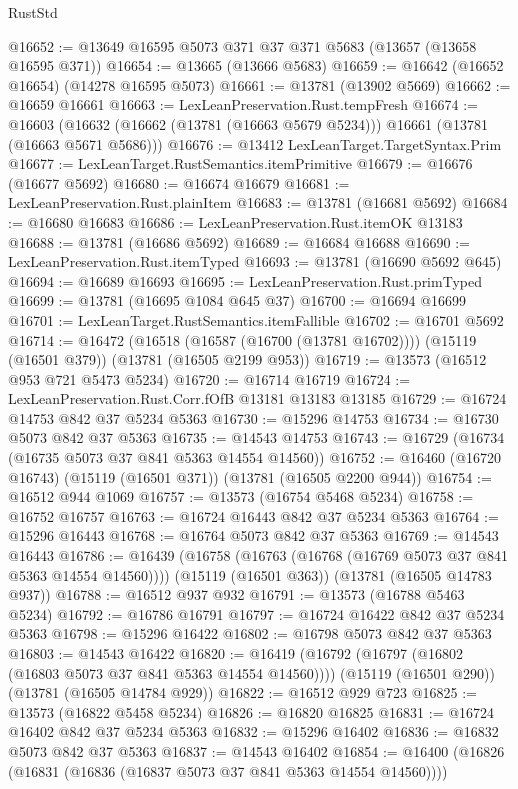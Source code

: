 \begin{lexlean}{RustStd}
\begin{coremodule}
@16652 := @13649 @16595 @5073 @371 @37 @371 @5683 (@13657 (@13658 @16595 @371))
@16654 := @13665 (@13666 @5683)
@16659 := @16642 (@16652 @16654) (@14278 @16595 @5073)
@16661 := @13781 (@13902 @5669)
@16662 := @16659 @16661
@16663 := LexLeanPreservation.Rust.tempFresh
@16674 := @16603
    (@16632 (@16662 (@13781 (@16663 @5679 @5234))) @16661 (@13781 (@16663 @5671 @5686)))
@16676 := @13412 LexLeanTarget.TargetSyntax.Prim
@16677 := LexLeanTarget.RustSemantics.itemPrimitive
@16679 := @16676 (@16677 @5692)
@16680 := @16674 @16679
@16681 := LexLeanPreservation.Rust.plainItem
@16683 := @13781 (@16681 @5692)
@16684 := @16680 @16683
@16686 := LexLeanPreservation.Rust.itemOK @13183
@16688 := @13781 (@16686 @5692)
@16689 := @16684 @16688
@16690 := LexLeanPreservation.Rust.itemTyped
@16693 := @13781 (@16690 @5692 @645)
@16694 := @16689 @16693
@16695 := LexLeanPreservation.Rust.primTyped
@16699 := @13781 (@16695 @1084 @645 @37)
@16700 := @16694 @16699
@16701 := LexLeanTarget.RustSemantics.itemFallible
@16702 := @16701 @5692
@16714 := @16472
    (@16518 (@16587 (@16700 (@13781 @16702))))
    (@15119 (@16501 @379))
    (@13781 (@16505 @2199 @953))
@16719 := @13573 (@16512 @953 @721 @5473 @5234)
@16720 := @16714 @16719
@16724 := LexLeanPreservation.Rust.Corr.fOfB @13181 @13183 @13185
@16729 := @16724 @14753 @842 @37 @5234 @5363
@16730 := @15296 @14753
@16734 := @16730 @5073 @842 @37 @5363
@16735 := @14543 @14753
@16743 := @16729 (@16734 (@16735 @5073 @37 @841 @5363 @14554 @14560))
@16752 := @16460 (@16720 @16743) (@15119 (@16501 @371)) (@13781 (@16505 @2200 @944))
@16754 := @16512 @944 @1069
@16757 := @13573 (@16754 @5468 @5234)
@16758 := @16752 @16757
@16763 := @16724 @16443 @842 @37 @5234 @5363
@16764 := @15296 @16443
@16768 := @16764 @5073 @842 @37 @5363
@16769 := @14543 @16443
@16786 := @16439
    (@16758 (@16763 (@16768 (@16769 @5073 @37 @841 @5363 @14554 @14560))))
    (@15119 (@16501 @363))
    (@13781 (@16505 @14783 @937))
@16788 := @16512 @937 @932
@16791 := @13573 (@16788 @5463 @5234)
@16792 := @16786 @16791
@16797 := @16724 @16422 @842 @37 @5234 @5363
@16798 := @15296 @16422
@16802 := @16798 @5073 @842 @37 @5363
@16803 := @14543 @16422
@16820 := @16419
    (@16792 (@16797 (@16802 (@16803 @5073 @37 @841 @5363 @14554 @14560))))
    (@15119 (@16501 @290))
    (@13781 (@16505 @14784 @929))
@16822 := @16512 @929 @723
@16825 := @13573 (@16822 @5458 @5234)
@16826 := @16820 @16825
@16831 := @16724 @16402 @842 @37 @5234 @5363
@16832 := @15296 @16402
@16836 := @16832 @5073 @842 @37 @5363
@16837 := @14543 @16402
@16854 := @16400
    (@16826 (@16831 (@16836 (@16837 @5073 @37 @841 @5363 @14554 @14560))))

\end{coremodule}
\end{lexlean}
